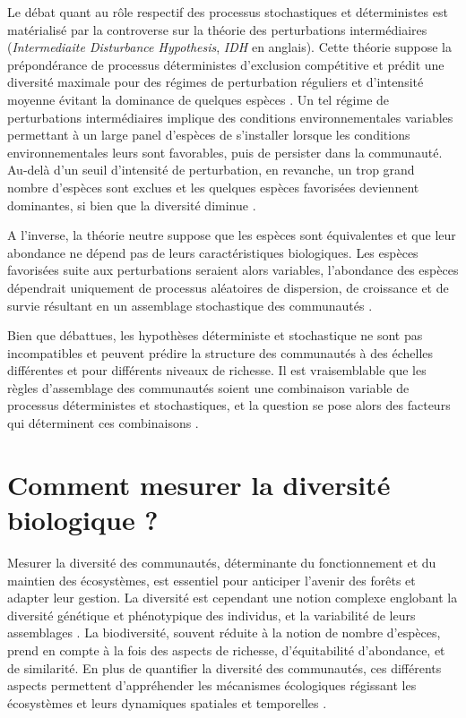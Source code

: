 \documentclass[
  11pt,
  french,
  A4paper,
  extrafontsizes,onecolumn,openright
  ]{memoir}
\begin{document}
Le débat quant au rôle respectif des processus stochastiques et
déterministes est matérialisé par la controverse sur la théorie des
perturbations intermédiaires (\emph{Intermediaite Disturbance
Hypothesis}, \emph{IDH} en anglais). Cette théorie suppose la
prépondérance de processus déterministes d'exclusion compétitive et
prédit une diversité maximale pour des régimes de perturbation réguliers
et d'intensité moyenne évitant la dominance de quelques espèces
\autocite{Molino2001}. Un tel régime de perturbations intermédiaires
implique des conditions environnementales variables permettant à un
large panel d'espèces de s'installer lorsque les conditions
environnementales leurs sont favorables, puis de persister dans la
communauté. Au-delà d'un seuil d'intensité de perturbation, en revanche,
un trop grand nombre d'espèces sont exclues et les quelques espèces
favorisées deviennent dominantes, si bien que la diversité diminue
\autocites{Chesson2000}{Kariuki2006a}{Berry2008a}.

A l'inverse, la théorie neutre suppose que les espèces sont équivalentes
et que leur abondance ne dépend pas de leurs caractéristiques
biologiques. Les espèces favorisées suite aux perturbations seraient
alors variables, l'abondance des espèces dépendrait uniquement de
processus aléatoires de dispersion, de croissance et de survie résultant
en un assemblage stochastique des communautés \autocite{Hubbell2001}.

Bien que débattues, les hypothèses déterministe et stochastique ne sont
pas incompatibles et peuvent prédire la structure des communautés à des
échelles différentes et pour différents niveaux de richesse. Il est
vraisemblable que les règles d'assemblage des communautés soient une
combinaison variable de processus déterministes et stochastiques, et la
question se pose alors des facteurs qui déterminent ces combinaisons
\autocite{Chave2004}.

\section{Comment mesurer la diversité biologique
?}\label{comment-mesurer-la-diversite-biologique}

Mesurer la diversité des communautés, déterminante du fonctionnement et
du maintien des écosystèmes, est essentiel pour anticiper l'avenir des
forêts et adapter leur gestion. La diversité est cependant une notion
complexe englobant la diversité génétique et phénotypique des individus,
et la variabilité de leurs assemblages \autocite{Loreau2005}. La
biodiversité, souvent réduite à la notion de nombre d'espèces, prend en
compte à la fois des aspects de richesse, d'équitabilité d'abondance, et
de similarité. En plus de quantifier la diversité des communautés, ces
différents aspects permettent d'appréhender les mécanismes écologiques
régissant les écosystèmes et leurs dynamiques spatiales et temporelles
\autocites{Purvis2000}{Loreau2005}.
\end{document}
